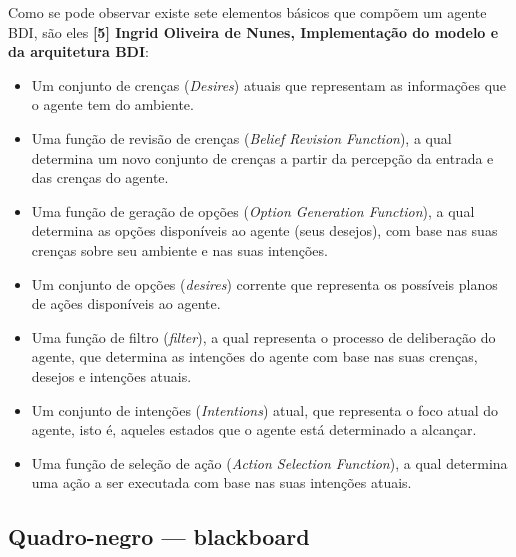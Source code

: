 Como se pode observar existe sete elementos básicos que compõem um agente BDI, são eles \textbf{[5] Ingrid Oliveira de Nunes, Implementação do modelo e da arquitetura BDI}:
\begin{itemize}
\item Um conjunto de crenças (\textit{Desires}) atuais que representam as informações que o agente tem do ambiente.
\item Uma função de revisão de crenças (\textit{Belief Revision Function}), a qual determina um novo conjunto de crenças a partir da percepção da entrada e das crenças do agente.
\item Uma função de geração de opções (\textit{Option Generation Function}), a qual determina as opções disponíveis ao agente (seus desejos), com base nas suas crenças sobre seu ambiente e nas suas intenções.
\item Um conjunto de opções (\textit{desires}) corrente que representa os possíveis planos de ações disponíveis ao agente.
\item Uma função de filtro (\textit{filter}), a qual representa o processo de deliberação do agente, que determina as intenções do agente com base nas suas crenças, desejos e intenções atuais.
\item Um conjunto de intenções (\textit{Intentions}) atual, que representa o foco atual do agente, isto é, aqueles estados que o agente está determinado a alcançar.
\item Uma função de seleção de ação (\textit{Action Selection Function}), a qual determina uma ação a ser executada com base nas suas intenções atuais. 
\end{itemize}

\subsection{Quadro-negro --- blackboard}

